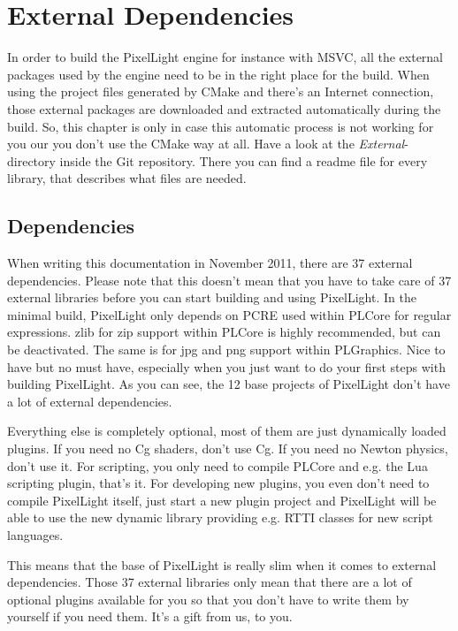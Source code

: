 \chapter{External Dependencies}
\label{Chapter:ExternalDependencies}
In order to build the PixelLight engine for instance with \ac{MSVC}, all the external packages used by the engine need to be in the right place for the build. When using the project files generated by CMake and there's an Internet connection, those external packages are downloaded and extracted automatically during the build. So, this chapter is only in case this automatic process is not working for you our you don't use the CMake way at all. Have a look at the \emph{External}-directory inside the Git repository. There you can find a readme file for every library, that describes what files are needed.




\section{Dependencies}
When writing this documentation in November 2011, there are 37 external dependencies. Please note that this doesn't mean that you have to take care of 37 external libraries before you can start building and using PixelLight. In the minimal build, PixelLight only depends on PCRE used within PLCore for regular expressions. zlib for zip support within PLCore is highly recommended, but can be deactivated. The same is for jpg and png support within PLGraphics. Nice to have but no must have, especially when you just want to do your first steps with building PixelLight. As you can see, the 12 base projects of PixelLight don't have a lot of external dependencies.

Everything else is completely optional, most of them are just dynamically loaded plugins. If you need no Cg shaders, don't use Cg. If you need no Newton physics, don't use it. For scripting, you only need to compile PLCore and e.g. the Lua scripting plugin, that's it. For developing new plugins, you even don't need to compile PixelLight itself, just start a new plugin project and PixelLight will be able to use the new dynamic library providing e.g. \ac{RTTI} classes for new script languages.

This means that the base of PixelLight is really slim when it comes to external dependencies. Those 37 external libraries only mean that there are a lot of optional plugins available for you so that you don't have to write them by yourself if you need them. It's a gift from us, to you.





